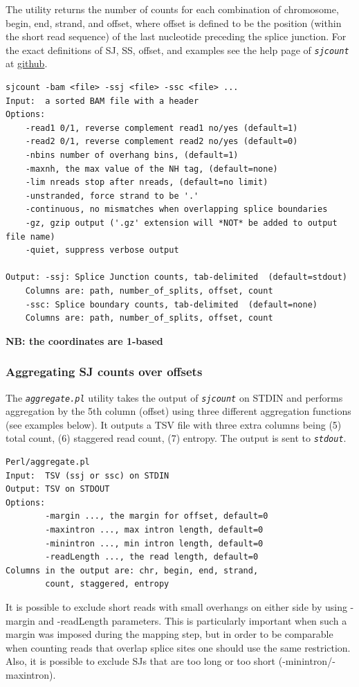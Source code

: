 \documentclass{article}
\newcommand{\prog}[1]{{\tt\em #1}}
\begin{document}
The utility returns the number of counts for each combination of chromosome, begin, end, strand, and offset, where offset is defined to 
be the position (within the short read sequence) of the last nucleotide preceding the splice junction. For the exact definitions of SJ, SS, 
offset, and examples see the help page of \prog{sjcount} at \href{https://github.com/pervouchine/sjcount}{github}. 

\begin{verbatim}
sjcount -bam <file> -ssj <file> -ssc <file> ...
Input:  a sorted BAM file with a header
Options:
	-read1 0/1, reverse complement read1 no/yes (default=1)
	-read2 0/1, reverse complement read2 no/yes (default=0)
	-nbins number of overhang bins, (default=1)
	-maxnh, the max value of the NH tag, (default=none)
	-lim nreads stop after nreads, (default=no limit)
	-unstranded, force strand to be '.'
	-continuous, no mismatches when overlapping splice boundaries
	-gz, gzip output ('.gz' extension will *NOT* be added to output file name)
	-quiet, suppress verbose output

Output:	-ssj: Splice Junction counts, tab-delimited  (default=stdout)
	Columns are: path, number_of_splits, offset, count
	-ssc: Splice boundary counts, tab-delimited  (default=none)
	Columns are: path, number_of_splits, offset, count
\end{verbatim}
{\bf NB: the coordinates are 1-based}


\subsubsection{Aggregating SJ counts over offsets}
The \prog{aggregate.pl} utility takes the output of \prog{sjcount} on STDIN and performs aggregation by the 5th column (offset) using three different aggregation functions 
(see examples below). It outputs a TSV file with three extra columns being (5) total count, (6) staggered read count, (7) entropy. The output is sent to \prog{stdout}. 
\begin{verbatim}
Perl/aggregate.pl   
Input:  TSV (ssj or ssc) on STDIN
Output: TSV on STDOUT
Options:
        -margin ..., the margin for offset, default=0
        -maxintron ..., max intron length, default=0
        -minintron ..., min intron length, default=0
        -readLength ..., the read length, default=0
Columns in the output are: chr, begin, end, strand, 
        count, staggered, entropy
\end{verbatim}
It is possible to exclude short reads with small overhangs on either side by using -margin and -readLength parameters. This is particularly important when such a margin 
was imposed during the mapping step, but in order to be comparable when counting reads that overlap splice sites one should use the same restriction. Also, it is possible 
to exclude SJs that are too long or too short (-minintron/-maxintron).
\end{document}
